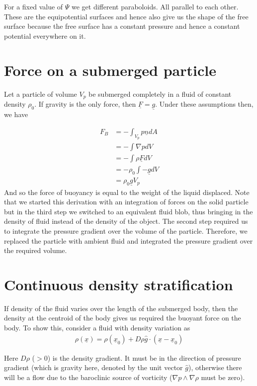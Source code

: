 \documentclass[11pt,a4paper]{article}
\newcommand{\vect}[1]{\underline{#1}}
\newcommand{\uvect}[1]{\hat{#1}}
\newcommand{\1}{\vect{1}}
\newcommand{\grad}{\nabla}
\begin{document}
For a fixed value of $\Psi$ we get different paraboloids. All parallel to each other. These are the equipotential surfaces and hence also give us the shape of the free surface because the free surface has a constant pressure and hence a constant potential everywhere on it.

\section{Force on a submerged particle}

Let a particle of volume $V_p$ be submerged completely in a fluid of constant density $\rho_0$. If gravity is the only force, then $\vect F = \vect g$. Under these assumptions then, we have

\begin{align*}
F_B &= -\int_{V_p} p \vect n dA \\
&= -\int \grad p dV \\
&= -\int \rho \vect F dV \\
&= -\rho_0 \int -\vect g dV \\
&= \rho_0 \vect g V_p
\end{align*}
And so the force of buoyancy is equal to the weight of the liquid displaced. Note that we started this derivation with an integration of forces on the solid particle but in the third step we switched to an equivalent fluid blob, thus bringing in the density of fluid instead of the density of the object. The second step required us to integrate the pressure gradient over the volume of the particle. Therefore, we replaced the particle with ambient fluid and integrated the pressure gradient over the required volume.

\section{Continuous density stratification}

If density of the fluid varies over the length of the submerged body, then the density at the centroid of the body gives us required the buoyant force on the body. To show this, consider a fluid with density variation as
\begin{align*}
\rho(\vect x) = \rho(\vect x_0) + D\rho \uvect{g} \cdot (\vect x - \vect x_0)
\end{align*}

Here $D\rho$ ($> 0$) is the density gradient. It must be in the direction of pressure gradient (which is gravity here, denoted by the unit vector $\uvect g$), otherwise there will be a flow due to the baroclinic source of vorticity ($\grad p \wedge \grad \rho$ must be zero). 
\end{document}
